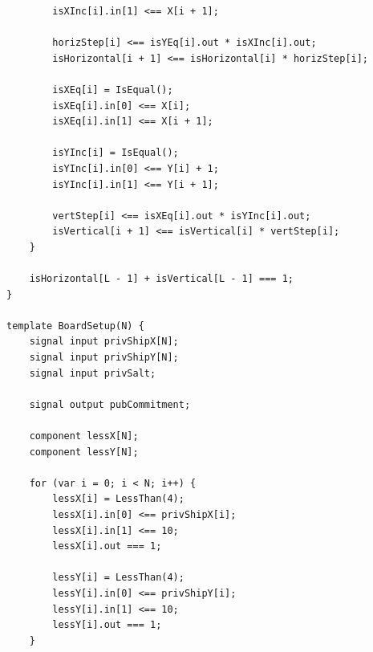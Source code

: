 \begin{listing}[H]
    \ContinuedFloat
    \begin{verbatim}
        isXInc[i].in[1] <== X[i + 1];

        horizStep[i] <== isYEq[i].out * isXInc[i].out;
        isHorizontal[i + 1] <== isHorizontal[i] * horizStep[i];

        isXEq[i] = IsEqual();
        isXEq[i].in[0] <== X[i];
        isXEq[i].in[1] <== X[i + 1];

        isYInc[i] = IsEqual();
        isYInc[i].in[0] <== Y[i] + 1;
        isYInc[i].in[1] <== Y[i + 1];

        vertStep[i] <== isXEq[i].out * isYInc[i].out;
        isVertical[i + 1] <== isVertical[i] * vertStep[i];
    }

    isHorizontal[L - 1] + isVertical[L - 1] === 1;
}

template BoardSetup(N) {
    signal input privShipX[N];
    signal input privShipY[N];
    signal input privSalt;

    signal output pubCommitment;

    component lessX[N];
    component lessY[N];

    for (var i = 0; i < N; i++) {
        lessX[i] = LessThan(4);
        lessX[i].in[0] <== privShipX[i];
        lessX[i].in[1] <== 10;
        lessX[i].out === 1;

        lessY[i] = LessThan(4);
        lessY[i].in[0] <== privShipY[i];
        lessY[i].in[1] <== 10;
        lessY[i].out === 1;
    }
    \end{verbatim}
    \caption{Na{\"\i}ve commitment for two coordinates (continued).}
    \label{lst:initialProofCircuitNaiveB}
\end{listing}

